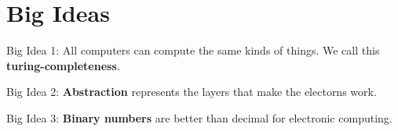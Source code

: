 
\section{Big Ideas}

\begin{definition}
	Big Idea 1: All computers can compute the same kinds of things. We call this \textbf{turing-completeness}.
\end{definition}

\begin{definition}
	Big Idea 2: \textbf{Abstraction} represents the layers that make the electorns work.
\end{definition}

\begin{definition}
	Big Idea 3: \textbf{Binary numbers} are better than decimal for electronic computing.
\end{definition}
